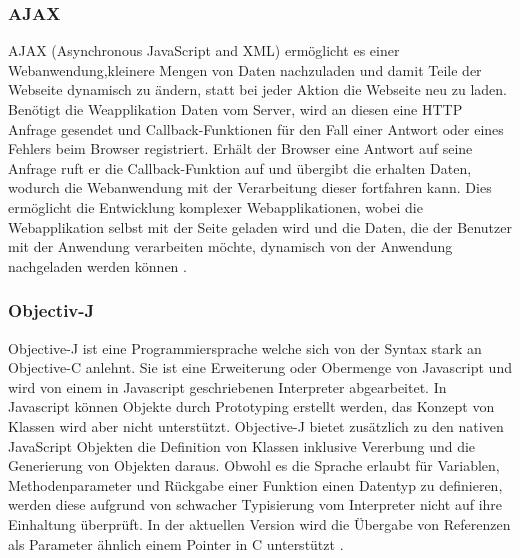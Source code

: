 \subsubsection{AJAX}
\label{sec:AJAX}
AJAX (Asynchronous JavaScript and XML) ermöglicht es einer Webanwendung,kleinere Mengen von Daten nachzuladen und damit Teile der Webseite dynamisch zu ändern, 
statt bei jeder Aktion die Webseite neu zu laden.
Benötigt die Weapplikation Daten vom Server, wird an diesen eine HTTP Anfrage gesendet und Callback-Funktionen für den Fall einer Antwort oder eines Fehlers beim Browser registriert.
Erhält der Browser eine Antwort auf seine Anfrage ruft er die Callback-Funktion auf und übergibt die erhalten Daten, wodurch die Webanwendung mit der Verarbeitung dieser fortfahren kann.
Dies ermöglicht die Entwicklung komplexer Webapplikationen, 
wobei die Webapplikation selbst mit der Seite geladen wird und die Daten, die der Benutzer mit der Anwendung verarbeiten möchte, dynamisch von der Anwendung nachgeladen werden können \cite{ajax}.

\subsubsection{Objectiv-J}
\label{sec:Objectiv-J}

Objective-J ist eine Programmiersprache welche sich von der Syntax stark an Objective-C anlehnt.
Sie ist eine Erweiterung oder Obermenge von Javascript und wird von einem in Javascript geschriebenen Interpreter abgearbeitet.
In Javascript können Objekte durch Prototyping erstellt werden, das Konzept von Klassen wird aber nicht unterstützt.
Objective-J bietet zusätzlich zu den nativen JavaScript Objekten die Definition von Klassen inklusive Vererbung und die Generierung von Objekten daraus.
Obwohl es die Sprache erlaubt für Variablen, Methodenparameter und Rückgabe einer Funktion einen Datentyp zu definieren, 
werden diese aufgrund von schwacher Typisierung vom Interpreter nicht auf ihre Einhaltung überprüft.
In der aktuellen Version wird die Übergabe von Referenzen als Parameter ähnlich einem Pointer in C unterstützt \cite{capp}.

